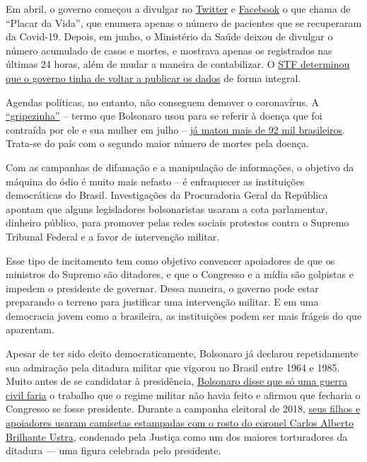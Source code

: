 Em abril, o governo começou a divulgar no
\href{https://twitter.com/secomvc/status/1257836970518200323}{Twitter} e
\href{https://www.facebookcorewwwi.onion/minsaude/posts/3549590468392877}{Facebook}
o que chama de ``Placar da Vida'', que enumera apenas o número de
pacientes que se recuperaram da Covid-19. Depois, em junho, o Ministério
da Saúde deixou de divulgar o número acumulado de casos e mortes, e
mostrava apenas os registrados nas últimas 24 horas, além de mudar a
maneira de contabilizar. O
\href{https://www.nytimes3xbfgragh.onion/2020/06/19/world/coronavirus-live-updates.html}{STF
determinou que o governo tinha de voltar a publicar os dados} de forma
integral.

Agendas políticas, no entanto, não conseguem demover o coronavírus. A
\href{https://www.cnn.com/2020/05/23/americas/brazil-coronavirus-hospitals-intl/index.html}{``gripezinha''}
-- termo que Bolsonaro usou para se referir à doença que foi contraída
por ele e sua mulher em julho --
\href{https://www.nytimes3xbfgragh.onion/interactive/2020/world/americas/brazil-coronavirus-cases.html}{já
matou mais de 92 mil brasileiros}. Trata-se do país com o segundo maior
número de mortes pela doença.

Com as campanhas de difamação e a manipulação de informações, o objetivo
da máquina do ódio é muito mais nefasto -- é enfraquecer as instituições
democráticas do Brasil. Investigações da Procuradoria Geral da República
apontam que alguns legisladores bolsonaristas usaram a cota parlamentar,
dinheiro público, para promover pelas redes sociais protestos contra o
Supremo Tribunal Federal e a favor de intervenção militar.

Esse tipo de incitamento tem como objetivo convencer apoiadores de que
os ministros do Supremo são ditadores, e que o Congresso e a mídia são
golpistas e impedem o presidente de governar. Dessa maneira, o governo
pode estar preparando o terreno para justificar uma intervenção militar.
E em uma democracia jovem como a brasileira, as instituições podem ser
mais frágeis do que aparentam.

Apesar de ter sido eleito democraticamente, Bolsonaro já declarou
repetidamente sua admiração pela ditadura militar que vigorou no Brasil
entre 1964 e 1985. Muito antes de se candidatar à presidência,
\href{https://www.youtube.com/watch?v=qIDyw9QKIvw\&t=577s}{Bolsonaro
disse que só uma guerra civil faria} o trabalho que o regime militar não
havia feito e afirmou que fecharia o Congresso se fosse presidente.
Durante a campanha eleitoral de 2018,
\href{https://congressoemfoco.uol.com.br/especial/noticias/fas-usam-imagem-de-torturador-para-promover-bolsonaro/}{seus
filhos e apoiadores usaram camisetas estampadas com o rosto do coronel
Carlos Alberto Brilhante Ustra}, condenado pela Justiça como um dos
maiores torturadores da ditadura --- uma figura celebrada pelo
presidente.

